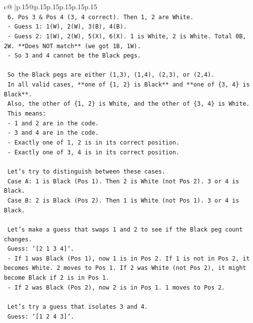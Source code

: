 \documentclass{article}
\begin{document}
{\begin{supertabular}{c@{$\;$}|p{.15\linewidth}@{}p{.15\linewidth}p{.15\linewidth}p{.15\linewidth}p{.15\linewidth}p{.15\linewidth}}
{{{\\ 
\texttt{    6. Pos 3 \& Pos 4 (3, 4 correct). Then 1, 2 are White.} \\
\texttt{       {-} Guess 1: 1(W), 2(W), 3(B), 4(B).} \\
\texttt{       {-} Guess 2: 1(W), 2(W), 5(X), 6(X). 1 is White, 2 is White. Total 0B, 2W. **Does NOT match** (we got 1B, 1W).} \\
\texttt{       {-} So 3 and 4 cannot be the Black pegs.} \\
\\ 
\texttt{    So the Black pegs are either (1,3), (1,4), (2,3), or (2,4).} \\
\texttt{    In all valid cases, **one of \{1, 2\} is Black** and **one of \{3, 4\} is Black**.} \\
\texttt{    Also, the other of \{1, 2\} is White, and the other of \{3, 4\} is White.} \\
\texttt{    This means:} \\
\texttt{    {-} 1 and 2 are in the code.} \\
\texttt{    {-} 3 and 4 are in the code.} \\
\texttt{    {-} Exactly one of 1, 2 is in its correct position.} \\
\texttt{    {-} Exactly one of 3, 4 is in its correct position.} \\
\\ 
\texttt{    Let's try to distinguish between these cases.} \\
\texttt{    Case A: 1 is Black (Pos 1). Then 2 is White (not Pos 2). 3 or 4 is Black.} \\
\texttt{    Case B: 2 is Black (Pos 2). Then 1 is White (not Pos 1). 3 or 4 is Black.} \\
\\ 
\texttt{    Let's make a guess that swaps 1 and 2 to see if the Black peg count changes.} \\
\texttt{    Guess: `{[}2 1 3 4{]}`.} \\
\texttt{    {-} If 1 was Black (Pos 1), now 1 is in Pos 2. If 1 is not in Pos 2, it becomes White. 2 moves to Pos 1. If 2 was White (not Pos 2), it might become Black if 2 is in Pos 1.} \\
\texttt{    {-} If 2 was Black (Pos 2), now 2 is in Pos 1. 1 moves to Pos 2.} \\
\\ 
\texttt{    Let's try a guess that isolates 3 and 4.} \\
\texttt{    Guess: `{[}1 2 4 3{]}`.} \\
}}}
\end{supertabular}}
\end{document}
